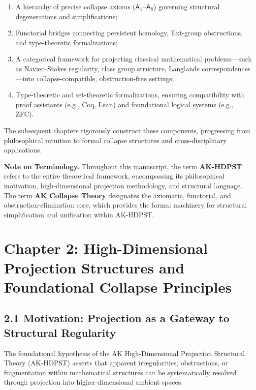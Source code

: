 \documentclass[11pt]{article}
\begin{document}
\begin{enumerate}
    \item A hierarchy of precise collapse axioms ($\mathsf{A}_1$–$\mathsf{A}_9$) governing structural degenerations and simplifications;
    \item Functorial bridges connecting persistent homology, Ext-group obstructions, and type-theoretic formalizations;
    \item A categorical framework for projecting classical mathematical problems—such as Navier–Stokes regularity, class group structure, Langlands correspondences—into collapse-compatible, obstruction-free settings;
    \item Type-theoretic and set-theoretic formalizations, ensuring compatibility with proof assistants (e.g., Coq, Lean) and foundational logical systems (e.g., ZFC).
\end{enumerate}

The subsequent chapters rigorously construct these components, progressing from philosophical intuition to formal collapse structures and cross-disciplinary applications.

\vspace{1em}
\noindent\textbf{Note on Terminology.}  
Throughout this manuscript, the term \textbf{AK-HDPST} refers to the entire theoretical framework, encompassing its philosophical motivation, high-dimensional projection methodology, and structural language.  
The term \textbf{AK Collapse Theory} designates the axiomatic, functorial, and obstruction-elimination core, which provides the formal machinery for structural simplification and unification within AK-HDPST.



\section{Chapter 2: High-Dimensional Projection Structures and Foundational Collapse Principles}

\subsection*{2.1 Motivation: Projection as a Gateway to Structural Regularity}

The foundational hypothesis of the AK High-Dimensional Projection Structural Theory (AK-HDPST) asserts that apparent irregularities, obstructions, or fragmentation within mathematical structures can be systematically resolved through projection into higher-dimensional ambient spaces.
\end{document}
